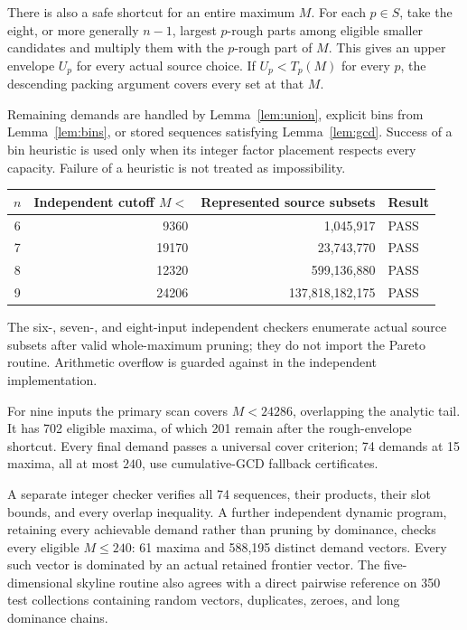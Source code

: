 \documentclass[11pt,a4paper]{article}
\begin{document}
There is also a safe shortcut for an entire maximum $M$. For each $p\in S$, take the eight, or more generally $n-1$, largest $p$-rough parts among eligible smaller candidates and multiply them with the $p$-rough part of $M$. This gives an upper envelope $U_p$ for every actual source choice. If $U_p<T_p(M)$ for every $p$, the descending packing argument covers every set at that $M$.

Remaining demands are handled by Lemma~\ref{lem:union}, explicit bins from Lemma~\ref{lem:bins}, or stored sequences satisfying Lemma~\ref{lem:gcd}. Success of a bin heuristic is used only when its integer factor placement respects every capacity. Failure of a heuristic is not treated as impossibility.

\begin{center}
\begin{tabular}{@{}crrl@{}}
\toprule
$n$ & Independent cutoff $M<$ & Represented source subsets & Result\\
\midrule
6&9360&1,045,917&PASS\\
7&19170&23,743,770&PASS\\
8&12320&599,136,880&PASS\\
9&24206&137,818,182,175&PASS\\
\bottomrule
\end{tabular}
\end{center}
The six-, seven-, and eight-input independent checkers enumerate actual source subsets after valid whole-maximum pruning; they do not import the Pareto routine. Arithmetic overflow is guarded against in the independent implementation.

For nine inputs the primary scan covers $M<24286$, overlapping the analytic tail. It has 702 eligible maxima, of which 201 remain after the rough-envelope shortcut. Every final demand passes a universal cover criterion; 74 demands at 15 maxima, all at most $240$, use cumulative-GCD fallback certificates.

A separate integer checker verifies all 74 sequences, their products, their slot bounds, and every overlap inequality. A further independent dynamic program, retaining every achievable demand rather than pruning by dominance, checks every eligible $M\le240$: 61 maxima and 588,195 distinct demand vectors. Every such vector is dominated by an actual retained frontier vector. The five-dimensional skyline routine also agrees with a direct pairwise reference on 350 test collections containing random vectors, duplicates, zeroes, and long dominance chains.
\end{document}
